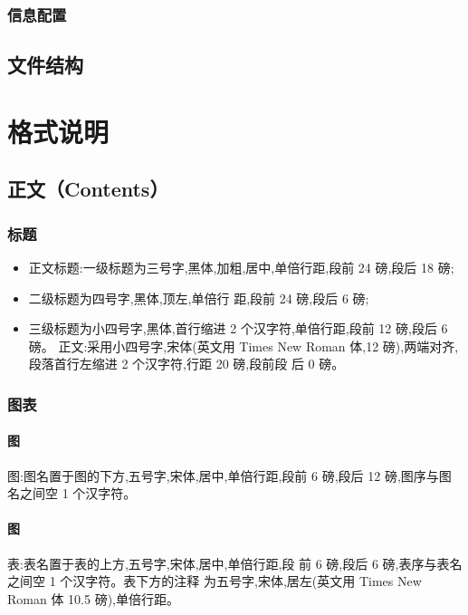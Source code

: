 \documentclass{LZU}
\begin{document}
\subsection{信息配置}
\section{文件结构}
\chapter{格式说明}
\section{正文（Contents）}
\subsection{标题}
\begin{itemize}
    \item 正文标题:一级标题为三号字,黑体,加粗,居中,单倍行距,段前 24 磅,段后 18 磅;
    \item 二级标题为四号字,黑体,顶左,单倍行 距,段前 24 磅,段后 6 磅;
    \item 三级标题为小四号字,黑体,首行缩进 2 个汉字符,单倍行距,段前 12 磅,段后 6 磅。 正文:采用小四号字,宋体(英文用 Times New Roman 体,12 磅),两端对齐,段落首行左缩进 2 个汉字符,行距 20 磅,段前段 后 0 磅。
\end{itemize}

\subsection{图表}
\subsubsection{图}
图:图名置于图的下方,五号字,宋体,居中,单倍行距,段前 6 磅,段后 12 磅,图序与图名之间空 1 个汉字符。
\subsubsection{图}
表:表名置于表的上方,五号字,宋体,居中,单倍行距,段 前 6 磅,段后 6 磅,表序与表名之间空 1 个汉字符。表下方的注释 为五号字,宋体,居左(英文用 Times New Roman 体 10.5 磅),单倍行距。
\end{document}
